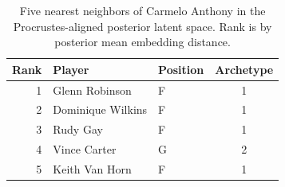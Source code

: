 \begin{table}[htbp]
  \centering\small
  \begin{tabular}{rllc}
    \toprule
    Rank & Player & Position & Archetype \\
    \midrule
    1 & Glenn Robinson & F & 1 \\
    2 & Dominique Wilkins & F & 1 \\
    3 & Rudy Gay & F & 1 \\
    4 & Vince Carter & G & 2 \\
    5 & Keith Van Horn & F & 1 \\
    \bottomrule
  \end{tabular}
  \caption{Five nearest neighbors of Carmelo Anthony in the Procrustes-aligned posterior latent space. Rank is by posterior mean embedding distance.}
  \label{tab:Carmelo_Anthony_neighbors}
\end{table}

